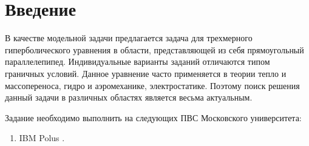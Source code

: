 \section*{Введение}
\label{sec:Chapter0} 

 	
В качестве модельной задачи предлагается задача для трехмерного гиперболического уравнения в области, представляющей из себя прямоугольный параллелепипед.
Индивидуальные варианты заданий отличаются типом граничных условий.
Данное уравнение часто применяется в теории тепло и массопереноса, гидро и аэромеханике, электростатике.
Поэтому поиск решения данный задачи в различных областях является весьма актуальным.


Задание необходимо выполнить на следующих ПВС Московского университета:
\begin{enumerate}
    \item IBM Polus \cite{Polus}.
\end{enumerate}
